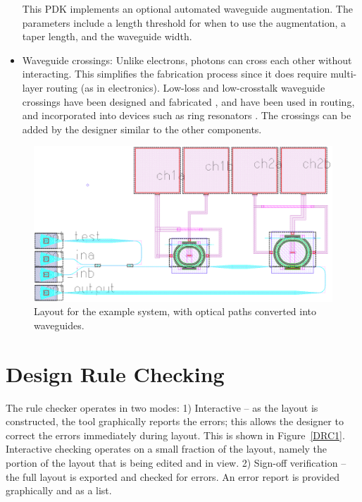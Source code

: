 \documentclass[journal]{spie}
\begin{document}
\begin{itemize}
		This PDK implements an optional automated waveguide augmentation.  The parameters include a length threshold for when to use the augmentation, a taper length, and the waveguide width.
		
		\item Waveguide crossings: Unlike electrons, photons can cross each other without interacting.  This simplifies the fabrication process since it does require multi-layer routing (as in electronics).  Low-loss and low-crosstalk waveguide crossings have been designed and fabricated \cite{bogaerts2007low-loss, zhang2013a-cmos-compatible}, and have been used in routing, and incorporated into devices such as ring resonators \cite{bogaerts2007low-loss}.  The crossings can be added by the designer similar to the other components.
	\end{itemize}


\begin{figure}[tbp]
\centering
 \includegraphics[width=0.7\linewidth]{../figs/layout_wdm2tx_done}
\caption{Layout for the example system, with optical paths converted into waveguides.}
\label{layout_wdm2tx_done}
\end{figure}

\section{Design Rule Checking}


The rule checker operates in two modes: 1) Interactive -- as the layout is constructed, the tool graphically reports the errors; this allows the designer to correct the errors immediately during layout.  This is shown in Figure~\ref{DRC1}.   Interactive checking operates on a small fraction of the layout, namely the portion of the layout that is being edited and in view.  2) Sign-off verification -- the full layout is exported and checked for errors.  An error report is provided graphically and as a list.
\end{document}
